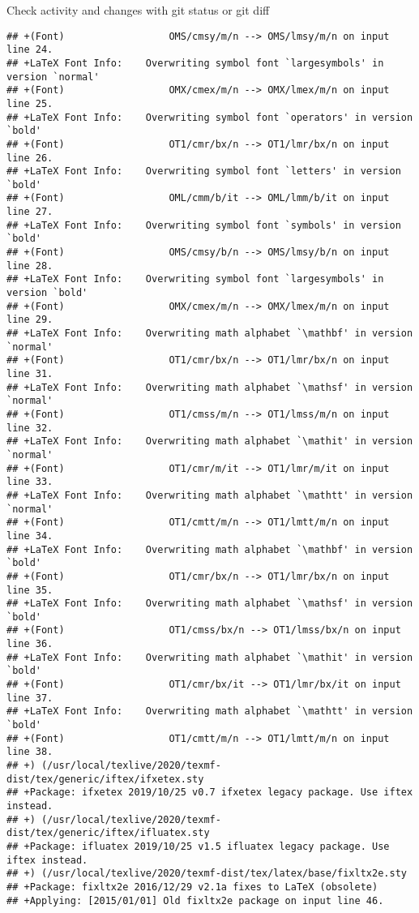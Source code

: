 \documentclass[ignorenonframetext,]{beamer}
\begin{document}
\begin{frame}[fragile]{Check activity and changes with git status or git
diff}
\begin{verbatim}
## +(Font)                  OMS/cmsy/m/n --> OMS/lmsy/m/n on input line 24.
## +LaTeX Font Info:    Overwriting symbol font `largesymbols' in version `normal'
## +(Font)                  OMX/cmex/m/n --> OMX/lmex/m/n on input line 25.
## +LaTeX Font Info:    Overwriting symbol font `operators' in version `bold'
## +(Font)                  OT1/cmr/bx/n --> OT1/lmr/bx/n on input line 26.
## +LaTeX Font Info:    Overwriting symbol font `letters' in version `bold'
## +(Font)                  OML/cmm/b/it --> OML/lmm/b/it on input line 27.
## +LaTeX Font Info:    Overwriting symbol font `symbols' in version `bold'
## +(Font)                  OMS/cmsy/b/n --> OMS/lmsy/b/n on input line 28.
## +LaTeX Font Info:    Overwriting symbol font `largesymbols' in version `bold'
## +(Font)                  OMX/cmex/m/n --> OMX/lmex/m/n on input line 29.
## +LaTeX Font Info:    Overwriting math alphabet `\mathbf' in version `normal'
## +(Font)                  OT1/cmr/bx/n --> OT1/lmr/bx/n on input line 31.
## +LaTeX Font Info:    Overwriting math alphabet `\mathsf' in version `normal'
## +(Font)                  OT1/cmss/m/n --> OT1/lmss/m/n on input line 32.
## +LaTeX Font Info:    Overwriting math alphabet `\mathit' in version `normal'
## +(Font)                  OT1/cmr/m/it --> OT1/lmr/m/it on input line 33.
## +LaTeX Font Info:    Overwriting math alphabet `\mathtt' in version `normal'
## +(Font)                  OT1/cmtt/m/n --> OT1/lmtt/m/n on input line 34.
## +LaTeX Font Info:    Overwriting math alphabet `\mathbf' in version `bold'
## +(Font)                  OT1/cmr/bx/n --> OT1/lmr/bx/n on input line 35.
## +LaTeX Font Info:    Overwriting math alphabet `\mathsf' in version `bold'
## +(Font)                  OT1/cmss/bx/n --> OT1/lmss/bx/n on input line 36.
## +LaTeX Font Info:    Overwriting math alphabet `\mathit' in version `bold'
## +(Font)                  OT1/cmr/bx/it --> OT1/lmr/bx/it on input line 37.
## +LaTeX Font Info:    Overwriting math alphabet `\mathtt' in version `bold'
## +(Font)                  OT1/cmtt/m/n --> OT1/lmtt/m/n on input line 38.
## +) (/usr/local/texlive/2020/texmf-dist/tex/generic/iftex/ifxetex.sty
## +Package: ifxetex 2019/10/25 v0.7 ifxetex legacy package. Use iftex instead.
## +) (/usr/local/texlive/2020/texmf-dist/tex/generic/iftex/ifluatex.sty
## +Package: ifluatex 2019/10/25 v1.5 ifluatex legacy package. Use iftex instead.
## +) (/usr/local/texlive/2020/texmf-dist/tex/latex/base/fixltx2e.sty
## +Package: fixltx2e 2016/12/29 v2.1a fixes to LaTeX (obsolete)
## +Applying: [2015/01/01] Old fixltx2e package on input line 46.

\end{verbatim}
\end{frame}
\end{document}
